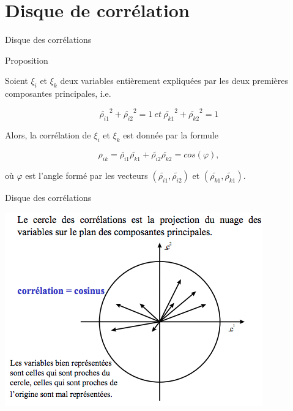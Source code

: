 \documentclass[12pt]{beamer}
\begin{document}
\section{Disque de corrélation}
\begin{frame}{Disque des corrélations}

  \begin{block}{Proposition}
  
  
  Soient $\xi_i$ et $\xi_k$ deux variables entièrement expliquées par les deux premières composantes principales, i.e.
  
  $$ \tilde{\rho_{i1}}^2 + \tilde{\rho_{i2}}^2=1 \ et  \  \tilde{\rho_{k1}}^2 + \tilde{\rho_{k2}}^2=1 $$
  
  Alors, la corrélation de $\xi_i$ et $\xi_k$ est donnée par la formule 
  
  $$  {\rho_{ik}}  = \tilde{\rho_{i1}}   \tilde{\rho_{k1}}  +  \tilde{\rho_{i2}}   \tilde{\rho_{k2}}  = cos(\varphi), $$

où $\varphi$ est l'angle formé par les vecteurs $(\tilde{\rho_{i1}}, \tilde{\rho_{i2}})$ et $(\tilde{\rho_{k1}}, \tilde{\rho_{k1}})$.
  
  \end{block}
 

\end{frame}

\begin{frame}{Disque des corrélations}

\centering 

 \includegraphics[scale=0.7]{Correlation.png}


\end{frame}
\end{document}
